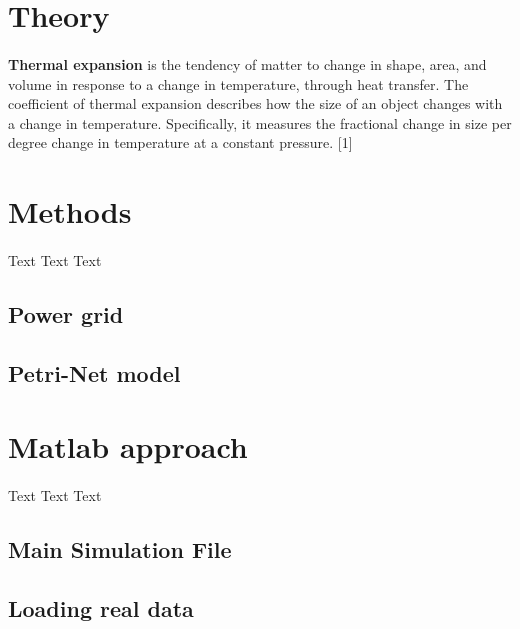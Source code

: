 \documentclass[a4paper]{article}
\begin{document}
%
\section{Theory}

\paragraph{}
\textbf{Thermal expansion} is the tendency of matter to change in shape, area, and volume in response to a change in temperature, through heat transfer. The coefficient of thermal expansion describes how the size of an object changes with a change in temperature. Specifically, it measures the fractional change in size per degree change in temperature at a constant pressure. [1]

%
\section{Methods}

\paragraph{}
Text Text Text

\subsection{Power grid}
\subsection{Petri-Net model}

%
\section{Matlab approach}

\paragraph{}
Text Text Text

\subsection{Main Simulation File}
\subsection{Loading real data}
\end{document}
